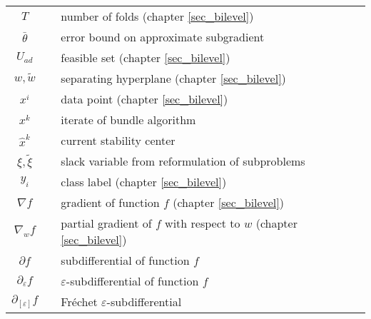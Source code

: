 \begin{longtable}{c@{}c@{} l@{}}
	\(T\) && number of folds (chapter \ref{sec_bilevel}) \\
	\(\bar{\theta}\) && error bound on approximate subgradient \\
	\(U_{ad}\) && feasible set (chapter \ref{sec_bilevel}) \\
	\(w, \tilde{w}\) && separating hyperplane (chapter \ref{sec_bilevel}) \\
	\(x^i\) && data point (chapter \ref{sec_bilevel}) \\ 
	\(x^k\) && iterate of bundle algorithm \\
	\(\hat{x}^k\) && current stability center \\
	\(\xi,\tilde{\xi}\) && slack variable from reformulation of subproblems \\
	\(y_i\) && class label (chapter \ref{sec_bilevel}) \\
	\(\nabla f\) && gradient of function \(f\) (chapter \ref{sec_bilevel})\\
	\(\nabla_{w}f\) && partial gradient of \(f\) with respect to \(w\) (chapter \ref{sec_bilevel}) \\
	\(\partial f\) && subdifferential of function \(f\) \\
	\(\partial_{\varepsilon}f\) && \(\varepsilon\)-subdifferential of function \(f\) \\
	\(\partial_{[\varepsilon]}f\) && Fr{\'e}chet \(\varepsilon\)-subdifferential \\
\end{longtable}
